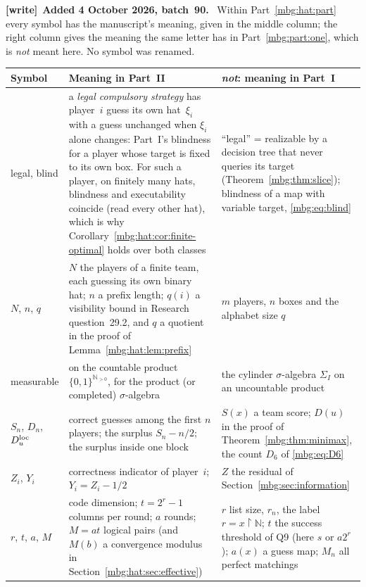 \documentclass[11pt,letterpaper]{article}
\theoremstyle{definition}
\newcommand{\N}{\mathbb N}
\newcommand{\Sig}{\Sigma}
\newcommand{\restr}{\mathbin{\upharpoonright}}
\newenvironment{writenote}[1][]{\par\smallskip\begingroup\small
 \noindent\textbf{[write]}\if\relax\detokenize{#1}\relax\else~\textbf{#1.}\fi\ }%
 {\par\endgroup\smallskip}
\begin{document}
\begin{writenote}[Added 4 October 2026, batch~90]
Within Part~\ref{mbg:hat:part} every symbol has the manuscript's meaning, given in the middle column; the right column gives the meaning the same letter has in Part~\ref{mbg:part:one}, which is \emph{not} meant here. No symbol was renamed.
\begin{longtable}{>{\raggedright\arraybackslash}p{}>{\raggedright\arraybackslash}p{}>{\raggedright\arraybackslash}p{}}
\toprule
Symbol & Meaning in Part~II & \emph{not}: meaning in Part~I\\
\midrule
\endhead
legal, blind & a \emph{legal compulsory strategy} has player~$i$ guess its own hat~$\xi_i$ with a guess unchanged when $\xi_i$ alone changes: Part~I's blindness for a player whose target is fixed to its own box. For such a player, on finitely many hats, blindness and executability coincide (read every other hat), which is why Corollary~\ref{mbg:hat:cor:finite-optimal} holds over both classes & ``legal'' = realizable by a decision tree that never queries its target (Theorem~\ref{mbg:thm:slice}); blindness of a map with variable target, \eqref{mbg:eq:blind}\\
$N$, $n$, $q$ & $N$ the players of a finite team, each guessing its own binary hat; $n$ a prefix length; $q(i)$ a visibility bound in Research question~29.2, and $q$ a quotient in the proof of Lemma~\ref{mbg:hat:lem:prefix} & $m$ players, $n$ boxes and the alphabet size $q$\\
measurable & on the countable product $\{0,1\}^{\N_{>0}}$, for the product (or completed) $\sigma$-algebra & the cylinder $\sigma$-algebra $\Sig_I$ on an uncountable product\\
$S_n$, $D_n$, $D^{\rm loc}_u$ & correct guesses among the first $n$ players; the surplus $S_n-n/2$; the surplus inside one block & $S(x)$ a team score; $D(u)$ in the proof of Theorem~\ref{mbg:thm:minimax}, the count $D_6$ of \eqref{mbg:eq:D6}\\
$Z_i$, $Y_i$ & correctness indicator of player~$i$; $Y_i=Z_i-1/2$ & $Z$ the residual of Section~\ref{mbg:sec:information}\\
$r$, $t$, $a$, $M$ & code dimension; $t=2^r-1$ columns per round; $a$ rounds; $M=at$ logical pairs (and $M(b)$ a convergence modulus in Section~\ref{mbg:hat:sec:effective}) & $r$ list size, $r_n$, the label $r=x\restr\N$; $t$ the success threshold of Q9 (here $s$ or $a2^r$); $a(x)$ a guess map; $M_n$ all perfect matchings\\

\end{longtable}
\end{writenote}
\end{document}
